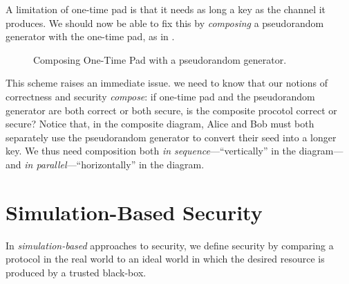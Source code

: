 \noindent
A limitation of one-time pad is that it needs as long a key as the channel it
produces. We should now be able to fix this by \emph{composing} a pseudorandom
generator with the one-time pad, as in .

\begin{figure}[h]
  \centering
  \caption{Composing One-Time Pad with a pseudorandom generator.}
  \label{fig:composed}
\end{figure}

This scheme raises an immediate issue.  we need to know that our notions of
correctness and security \emph{compose}: if one-time pad and the pseudorandom
generator are both correct or both secure, is the composite procotol correct or
secure? Notice that, in the composite diagram, Alice and Bob must both
separately use the pseudorandom generator to convert their seed into a longer
key. We thus need composition both \emph{in sequence}---``vertically'' in the
diagram---and \emph{in parallel}---``horizontally'' in the diagram.

\section{Simulation-Based Security}

In \emph{simulation-based} approaches to security, we define security by
comparing a protocol in the real world to an ideal world in which the desired
resource is produced by a trusted black-box.
